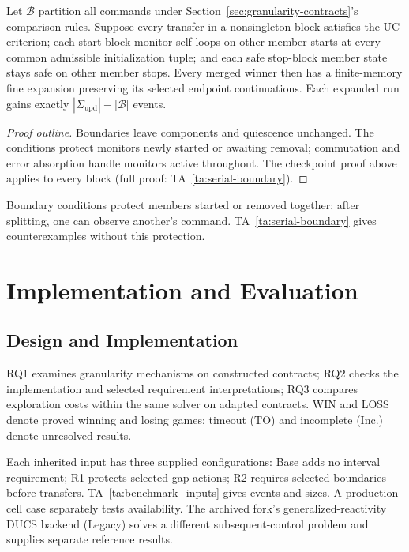 \documentclass[acmsmall,screen,review,anonymous]{acmart}
\newcommand{\SigmaU}{\Sigma_{\mathrm{upd}}}
\begin{document}
\begin{proposition}\label{prop:serial-all}
Let $\mathcal B$ partition all commands under Section~\ref{sec:granularity-contracts}'s comparison rules. Suppose every transfer in a nonsingleton block satisfies the UC criterion; each start-block monitor self-loops on other member starts at every common admissible initialization tuple; and each safe stop-block member state stays safe on other member stops. Every merged winner then has a finite-memory fine expansion preserving its selected endpoint continuations. Each expanded run gains exactly $|\SigmaU|-|\mathcal B|$ events.
\end{proposition}
\begin{proof}[Proof outline]
Boundaries leave components and quiescence unchanged. The conditions protect monitors newly started or awaiting removal; commutation and error absorption handle monitors active throughout. The checkpoint proof above applies to every block (full proof: TA~\ref{ta:serial-boundary}).
\end{proof}
Boundary conditions protect members started or removed together: after splitting, one can observe another's command. TA~\ref{ta:serial-boundary} gives counterexamples without this protection.

\section{Implementation and Evaluation}
\label{sec:evaluation}
\subsection{Design and Implementation}

RQ1 examines granularity mechanisms on constructed contracts; RQ2 checks the implementation and selected requirement interpretations; RQ3 compares exploration costs within the same solver on \ApplicationContracts{} adapted contracts. WIN and LOSS denote proved winning and losing games; timeout (TO) and incomplete (Inc.) denote unresolved results.

Each inherited input has three supplied configurations: Base adds no interval requirement; R1 protects selected gap actions; R2 requires selected boundaries before transfers. TA~\ref{ta:benchmark_inputs} gives events and sizes. A production-cell case separately tests availability. The archived fork's generalized-reactivity DUCS backend (Legacy) solves a different subsequent-control problem and supplies separate reference results.
\end{document}
